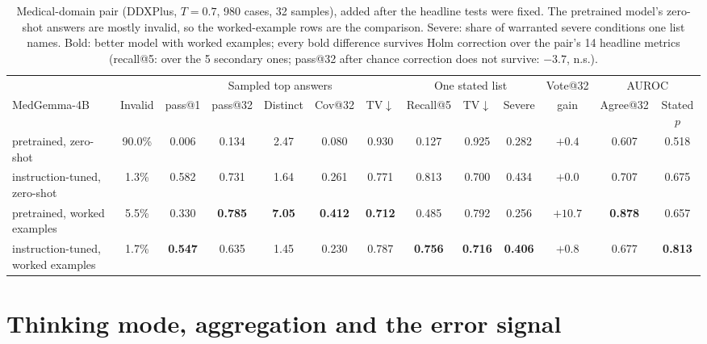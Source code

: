 \documentclass[wcp]{jmlr}
\begin{document}
\begin{table}[t]
\centering\small
\setlength{\tabcolsep}{3pt}
\begin{adjustbox}{max width=\linewidth}
\begin{tabular}{lcccccccccccc}
\toprule
 & & \multicolumn{5}{c}{Sampled top answers} & \multicolumn{3}{c}{One stated list} & Vote@32 & \multicolumn{2}{c}{AUROC} \\
MedGemma-4B & Invalid & pass@1 & pass@32 & Distinct & Cov@32 & TV$\downarrow$ & Recall@5 & TV$\downarrow$ & Severe & gain & Agree@32 & Stated $p$ \\
\midrule
pretrained, zero-shot & 90.0\% & 0.006 & 0.134 & 2.47 & 0.080 & 0.930 & 0.127 & 0.925 & 0.282 & $+0.4$ & 0.607 & 0.518 \\
instruction-tuned, zero-shot & 1.3\% & 0.582 & 0.731 & 1.64 & 0.261 & 0.771 & 0.813 & 0.700 & 0.434 & $+0.0$ & 0.707 & 0.675 \\
\midrule
pretrained, worked examples & 5.5\% & 0.330 & \textbf{0.785} & \textbf{7.05} & \textbf{0.412} & \textbf{0.712} & 0.485 & 0.792 & 0.256 & $+10.7$ & \textbf{0.878} & 0.657 \\
instruction-tuned, worked examples & 1.7\% & \textbf{0.547} & 0.635 & 1.45 & 0.230 & 0.787 & \textbf{0.756} & \textbf{0.716} & \textbf{0.406} & $+0.8$ & 0.677 & \textbf{0.813} \\
\bottomrule
\end{tabular}
\end{adjustbox}
\caption{Medical-domain pair (DDXPlus, $T{=}0.7$, 980 cases, 32 samples), added after the headline tests were fixed. The pretrained model's zero-shot answers are mostly invalid, so the worked-example rows are the comparison. Severe: share of warranted severe conditions one list names. Bold: better model with worked examples; every bold difference survives Holm correction over the pair's 14 headline metrics (recall@5: over the 5 secondary ones; pass@32 after chance correction does not survive: $-3.7$, n.s.).}
\label{tab:medgemma}
\end{table}

\section{Thinking mode, aggregation and the error signal}\label{app:consequences}
\end{document}
